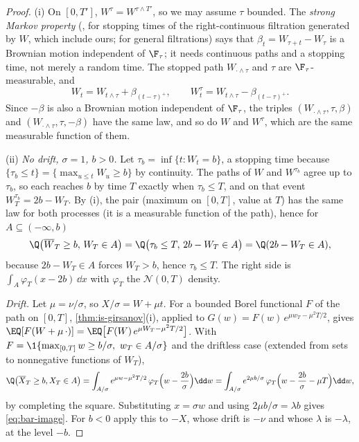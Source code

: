 \begin{proof}
(i) On $[0,T']$, $W^\tau=W^{\tau\wedge T'}$, so we may assume $\tau$ bounded. The \emph{strong Markov property}
(\citealp[Theorem~2.16]{morters-peres}, for stopping times of the right-continuous filtration
generated by $W$, which include ours; \citealp[Section~2.6]{karatzas-shreve} for general
filtrations) says that $\beta_t=W_{\tau+t}-W_\tau$ is a Brownian motion independent of $\F_\tau$; it
needs continuous paths and a stopping time, not merely a random time. The stopped path $W_{\cdot\wedge\tau}$ and $\tau$ are
$\F_\tau$-measurable, and
\[
  W_t=W_{t\wedge\tau}+\beta_{(t-\tau)^+},\qquad W^\tau_t=W_{t\wedge\tau}-\beta_{(t-\tau)^+}.
\]
Since $-\beta$ is also a Brownian motion independent of $\F_\tau$, the triples
$(W_{\cdot\wedge\tau},\tau,\beta)$ and $(W_{\cdot\wedge\tau},\tau,-\beta)$ have the same law, and so
do $W$ and $W^\tau$, which are the same measurable function of them.

(ii) \emph{No drift, $\sigma=1$, $b>0$.} Let $\tau_b=\inf\{t:W_t=b\}$, a stopping time because
$\{\tau_b\le t\}=\{\max_{u\le t}W_u\ge b\}$ by continuity. The paths of $W$ and $W^{\tau_b}$
agree up to $\tau_b$, so each reaches $b$ by time $T$ exactly when $\tau_b\le T$, and on that
event $W^{\tau_b}_T=2b-W_T$. By (i), the pair (maximum on $[0,T]$, value at $T$) has the same
law for both processes (it is a measurable function of the path), hence for $A\subseteq(-\infty,b)$
\[
  \Q\big(\overline W_T\ge b,\,W_T\in A\big)=\Q\big(\tau_b\le T,\,2b-W_T\in A\big)=\Q(2b-W_T\in A),
\]
because $2b-W_T\in A$ forces $W_T>b$, hence $\tau_b\le T$. The right side is
$\int_A\varphi_T(x-2b)\,\dd x$ with $\varphi_T$ the $\mathcal N(0,T)$ density.

\emph{Drift.} Let $\mu=\nu/\sigma$, so $X/\sigma=W+\mu t$. For a bounded Borel functional $F$ of the
path on $[0,T]$, \cref{thm:is-girsanov}(i), applied to $G(w)=F(w)\,e^{\mu w_T-\mu^2T/2}$, gives
$\EQ[F(W+\mu\,\cdot)]=\EQ\big[F(W)\,e^{\mu W_T-\mu^2T/2}\big]$. With
$F=\1\{\max_{[0,T]}w\ge b/\sigma,\ w_T\in A/\sigma\}$ and the driftless case (extended from sets
to nonnegative functions of $W_T$),
\[
  \Q\big(\overline X_T\ge b,X_T\in A\big)=\int_{A/\sigma}e^{\mu w-\mu^2T/2}\,\varphi_T\Big(w-\frac{2b}\sigma\Big)\dd w
  =\int_{A/\sigma}e^{2\mu b/\sigma}\,\varphi_T\Big(w-\frac{2b}\sigma-\mu T\Big)\dd w,
\]
by completing the square. Substituting $x=\sigma w$ and using $2\mu b/\sigma=\lambda b$ gives
\eqref{eq:bar-image}. For $b<0$ apply this to $-X$, whose drift is $-\nu$ and whose $\lambda$
is $-\lambda$, at the level $-b$.


\end{proof}
